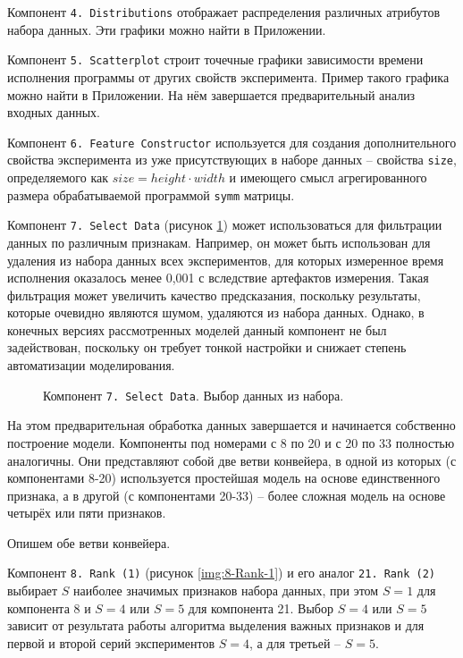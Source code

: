 Компонент \texttt{4. Distributions} отображает распределения различных атрибутов набора данных. Эти графики можно найти в Приложении.

Компонент \texttt{5. Scatterplot} строит точечные графики зависимости времени исполнения программы от других свойств эксперимента. Пример такого графика можно найти в Приложении. На нём завершается предварительный анализ входных данных.

Компонент \texttt{6. Feature Constructor} используется для создания дополнительного свойства эксперимента из уже присутствующих в наборе данных -- свойства \texttt{size}, определяемого как $size = height \cdot width$ и имеющего смысл агрегированного размера обрабатываемой программой \texttt{symm} матрицы.

Компонент \texttt{7. Select Data} (рисунок \ref{img:7-Select-Data}) может использоваться для фильтрации данных по различным признакам. Например, он может быть использован для удаления из набора данных всех экспериментов, для которых измеренное время исполнения оказалось менее 0,001 с вследствие артефактов измерения. Такая фильтрация может увеличить качество предсказания, поскольку результаты, которые очевидно являются шумом, удаляются из набора данных. Однако, в конечных версиях рассмотренных моделей данный компонент не был задействован, поскольку он требует тонкой настройки и снижает степень автоматизации моделирования.

\begin{figure}[H]
    \caption{Компонент \texttt{7. Select Data}. Выбор данных из набора.}
    \label{img:7-Select-Data}
\end{figure}

На этом предварительная обработка данных завершается и начинается собственно построение модели. Компоненты под номерами с 8 по 20 и с 20 по 33 полностью аналогичны. Они представляют собой две ветви конвейера, в одной из которых (с компонентами 8-20) используется простейшая модель на основе единственного признака, а в другой (с компонентами 20-33) -- более сложная модель на основе четырёх или пяти признаков.

Опишем обе ветви конвейера.

Компонент \texttt{8. Rank (1)} (рисунок \ref{img:8-Rank-1}) и его аналог \texttt{21. Rank (2)}  выбирает $S$ наиболее значимых признаков набора данных, при этом $S = 1$ для компонента 8 и $S = 4$ или $S = 5$ для компонента 21. Выбор $S = 4$ или $S = 5$ зависит от результата работы алгоритма выделения важных признаков и для первой и второй серий экспериментов $S = 4$, а для третьей -- $S = 5$.


